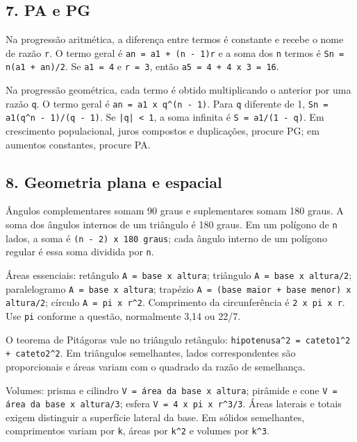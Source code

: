 \documentclass[11pt,a4paper]{article}
\begin{document}
\subsection*{7. PA e PG}

Na progressão aritmética, a diferença entre termos é constante e recebe o nome de razão \texttt{r}. O termo geral é \texttt{an = a1 + (n - 1)r} e a soma dos \texttt{n} termos é \texttt{Sn = n(a1 + an)/2}. Se \texttt{a1 = 4} e \texttt{r = 3}, então \texttt{a5 = 4 + 4 x 3 = 16}.

Na progressão geométrica, cada termo é obtido multiplicando o anterior por uma razão \texttt{q}. O termo geral é \texttt{an = a1 x q\textasciicircum{}(n - 1)}. Para \texttt{q} diferente de 1, \texttt{Sn = a1(q\textasciicircum{}n - 1)/(q - 1)}. Se \texttt{|q| < 1}, a soma infinita é \texttt{S = a1/(1 - q)}. Em crescimento populacional, juros compostos e duplicações, procure PG; em aumentos constantes, procure PA.

\subsection*{8. Geometria plana e espacial}

Ângulos complementares somam 90 graus e suplementares somam 180 graus. A soma dos ângulos internos de um triângulo é 180 graus. Em um polígono de \texttt{n} lados, a soma é \texttt{(n - 2) x 180 graus}; cada ângulo interno de um polígono regular é essa soma dividida por \texttt{n}.

Áreas essenciais: retângulo \texttt{A = base x altura}; triângulo \texttt{A = base x altura/2}; paralelogramo \texttt{A = base x altura}; trapézio \texttt{A = (base maior + base menor) x altura/2}; círculo \texttt{A = pi x r\textasciicircum{}2}. Comprimento da circunferência é \texttt{2 x pi x r}. Use \texttt{pi} conforme a questão, normalmente 3,14 ou 22/7.

O teorema de Pitágoras vale no triângulo retângulo: \texttt{hipotenusa\textasciicircum{}2 = cateto1\textasciicircum{}2  + cateto2\textasciicircum{}2}. Em triângulos semelhantes, lados correspondentes são proporcionais e áreas variam com o quadrado da razão de semelhança.

Volumes: prisma e cilindro \texttt{V = área da base x altura}; pirâmide e cone \texttt{V = área da base x altura/3}; esfera \texttt{V = 4 x pi x r\textasciicircum{}3/3}. Áreas laterais e totais exigem distinguir a superfície lateral da base. Em sólidos semelhantes, comprimentos variam por \texttt{k}, áreas por \texttt{k\textasciicircum{}2} e volumes por \texttt{k\textasciicircum{}3}.
\end{document}
